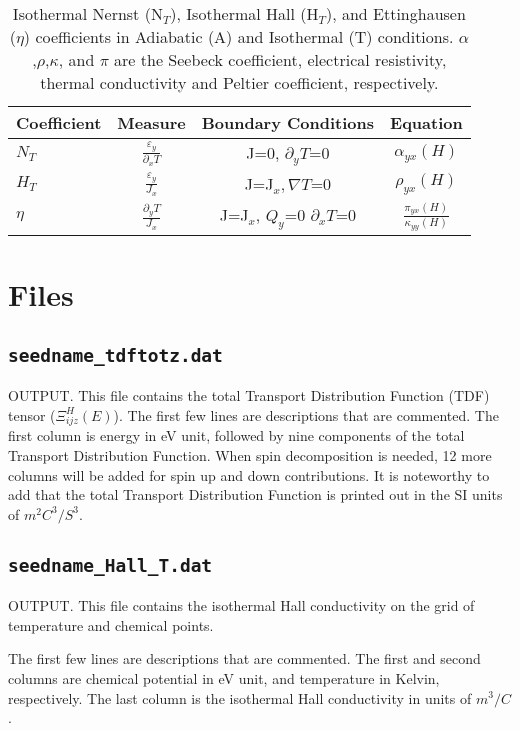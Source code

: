\begin{table}
 \caption{Isothermal Nernst (N$_{T}$), Isothermal Hall (H$_{T}$), and Ettinghausen ($\eta$) coefficients in Adiabatic (A) and Isothermal (T) conditions. $\alpha$,$\rho$,$\kappa$, and $\pi$ are the Seebeck coefficient, electrical resistivity, thermal conductivity and Peltier coefficient, respectively.}
 \centering
 \noindent
 \begin{tabular}{lccc} %
    \hline
    \hline
    \textbf{Coefficient} &\textbf{Measure} &\textbf{Boundary Conditions} & \textbf{Equation}  \\
    \hline
    \hline
   $N_{T}$  & $\frac{\varepsilon_y}{\partial_x T}$ & J=0, $ \partial_yT\textbf{=}0$ & $\alpha_{yx}(H)$   \\
    $H_{T}$  & $\frac{\varepsilon_y}{J_x }$ &  J=J$_x, \nabla T\textbf{=}0$ & $\rho _{yx}(H)$ \\
    $\eta$    & $\frac{\partial_yT}{J_x}$ &  J=J$_x$, $Q_y\textbf{=}0$ $\partial_xT\textbf{=}0$ & $\frac{\pi_{yx}(H)}{\kappa_{yy}(H)}$\\
    \hline  
    \hline 
 \end{tabular}
 \label{TMco}
\end{table}

\section{Files}

\subsection{{\tt seedname\_tdftotz.dat}}
OUTPUT. This file contains the total Transport Distribution Function (TDF) tensor ($\Xi_{ijz}^H(E)$). The first few lines are descriptions that are commented. The first column is energy in eV unit, followed by nine components of the total Transport Distribution Function. When spin decomposition is needed, 12  more columns will be added for spin up and down contributions.  It is noteworthy to add that the total Transport Distribution Function is printed out in the SI units of  $m^2C^3/S^3$.  

\subsection{{\tt seedname\_Hall_T.dat}}
OUTPUT. This file contains the isothermal Hall conductivity on the grid of temperature and chemical points. 

The first few lines are descriptions that are commented. The first and second columns are chemical potential in eV unit, and temperature in Kelvin, respectively. The last column is the isothermal Hall conductivity in units of $m^3/C$. 

